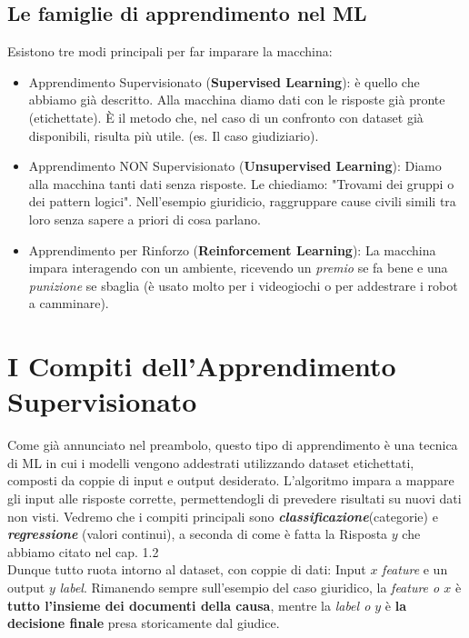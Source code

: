 \documentclass{article}
\begin{document}
\subsection{Le famiglie di apprendimento nel ML}
Esistono tre modi principali per far imparare la macchina:
\begin{itemize}
    \item Apprendimento Supervisionato (\textbf{Supervised Learning}): è quello che abbiamo già descritto. Alla macchina diamo dati con le risposte già pronte (etichettate). È il metodo che, nel caso di un confronto con dataset già disponibili, risulta più utile. (es. Il caso giudiziario).

    \item Apprendimento NON Supervisionato (\textbf{Unsupervised Learning}): Diamo alla macchina tanti dati senza risposte. Le chiediamo: "Trovami dei gruppi o dei pattern logici". Nell'esempio giuridicio, raggruppare cause civili simili tra loro senza sapere a priori di cosa parlano.

    \item Apprendimento per Rinforzo (\textbf{Reinforcement Learning}): La macchina impara interagendo con un ambiente, ricevendo un \textit{premio} se fa bene e una \textit{punizione} se sbaglia (è usato molto per i videogiochi o per addestrare i robot a camminare).
\end{itemize}



\section{I Compiti dell'Apprendimento Supervisionato}
Come già annunciato nel preambolo, questo tipo di apprendimento è una tecnica di ML in cui i modelli vengono addestrati utilizzando dataset etichettati, composti da coppie di input e output desiderato. L'algoritmo impara a mappare gli input alle risposte corrette, permettendogli di prevedere risultati su nuovi dati non visti. Vedremo che i compiti principali sono \textit{\textbf{classificazione}}(categorie) e \textit{\textbf{regressione}} (valori continui), a seconda di come è fatta la Risposta $y$ che abbiamo citato nel cap. 1.2\\
Dunque tutto ruota intorno al dataset, con coppie di dati: Input $x$ \textit{feature} e un output $y$ \textit{label}.
Rimanendo sempre sull'esempio del caso giuridico, la \textit{feature o $x$} è \textbf{tutto l'insieme dei documenti della causa}, mentre la \textit{label o $y$} è \textbf{la decisione finale} presa storicamente dal giudice.
\end{document}

